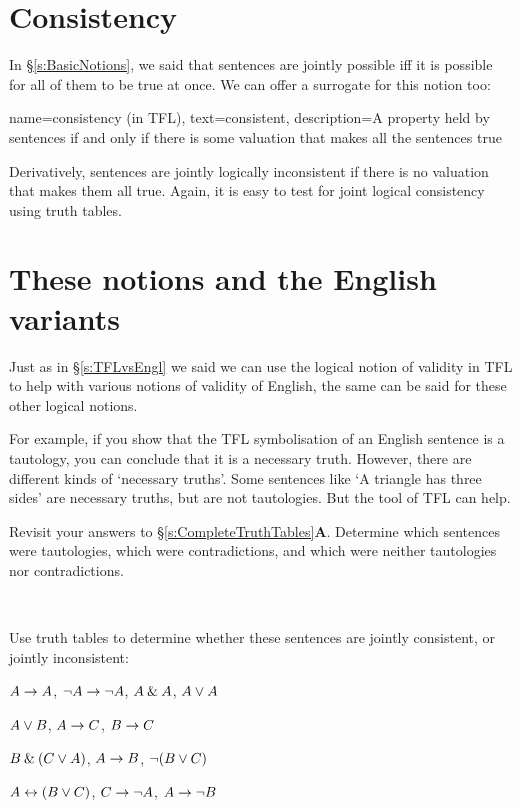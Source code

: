 \section{Consistency}
In \S\ref{s:BasicNotions}, we said that sentences are jointly possible iff it is possible for all of them to be true at once. We can offer a surrogate for this notion too:

{
  name=consistency (in TFL),
  text=consistent,
description={A property held by sentences if and only if there is some \gls{valuation} that makes all the sentences true}
}

Derivatively, sentences are jointly logically inconsistent if there is no valuation that makes them all true. Again, it is easy to test for joint logical consistency using truth tables.

\section{These notions and the English variants}
Just as in \S\ref{s:TFLvsEngl} we said we can use the logical notion of validity in TFL to help with various notions of validity of English, the same can  be said for these other logical notions.

For example, if you show that the TFL symbolisation of an English sentence is a tautology, you can conclude that it is a necessary truth. However, there are different kinds of `necessary truths'. Some sentences like `A triangle has three sides' are necessary truths, but are not tautologies. But the tool of TFL can help.


\practiceproblems
\problempart
Revisit your answers to \S\ref{s:CompleteTruthTables}\textbf{A}. Determine which sentences were tautologies, which were contradictions, and which were neither tautologies nor contradictions.
\solutions

\

\problempart
\label{pr.TT.consistent}
Use truth tables to determine whether these sentences are jointly consistent, or jointly inconsistent:
\begin{earg}
\item $A\rightarrow A$, $\neg A \rightarrow \neg A$, $A\mathbin{\&} A$, $A\vee A$ %
\item $A\vee B$, $A\rightarrow C$, $B\rightarrow C$ %
\item $B\mathbin{\&}(C\vee A)$, $A\rightarrow B$, $\neg(B\vee C)$  %
\item $A\leftrightarrow(B\vee C)$, $C\rightarrow \neg A$, $A\rightarrow \neg B$ %
\end{earg}



